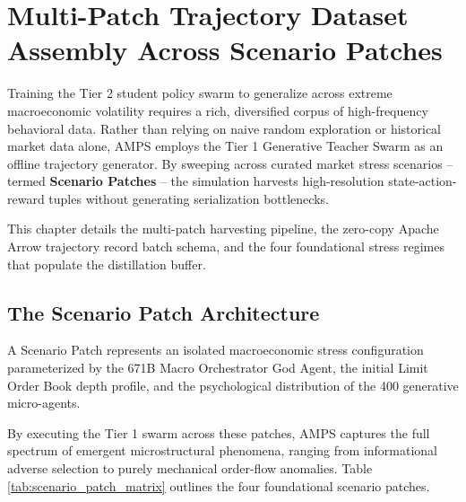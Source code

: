 \chapter{Multi-Patch Trajectory Dataset Assembly Across Scenario Patches}
\label{ch:multi_patch_harvesting}

Training the Tier 2 student policy swarm to generalize across extreme macroeconomic volatility requires a rich, diversified corpus of high-frequency behavioral data. Rather than relying on naive random exploration or historical market data alone, AMPS employs the Tier 1 Generative Teacher Swarm as an offline trajectory generator. By sweeping across curated market stress scenarios -- termed \textbf{Scenario Patches} -- the simulation harvests high-resolution state-action-reward tuples without generating serialization bottlenecks.

This chapter details the multi-patch harvesting pipeline, the zero-copy Apache Arrow trajectory record batch schema, and the four foundational stress regimes that populate the distillation buffer.

\section{The Scenario Patch Architecture}

A Scenario Patch represents an isolated macroeconomic stress configuration parameterized by the 671B Macro Orchestrator God Agent, the initial Limit Order Book depth profile, and the psychological distribution of the 400 generative micro-agents. 

By executing the Tier 1 swarm across these patches, AMPS captures the full spectrum of emergent microstructural phenomena, ranging from informational adverse selection to purely mechanical order-flow anomalies. Table \ref{tab:scenario_patch_matrix} outlines the four foundational scenario patches.

